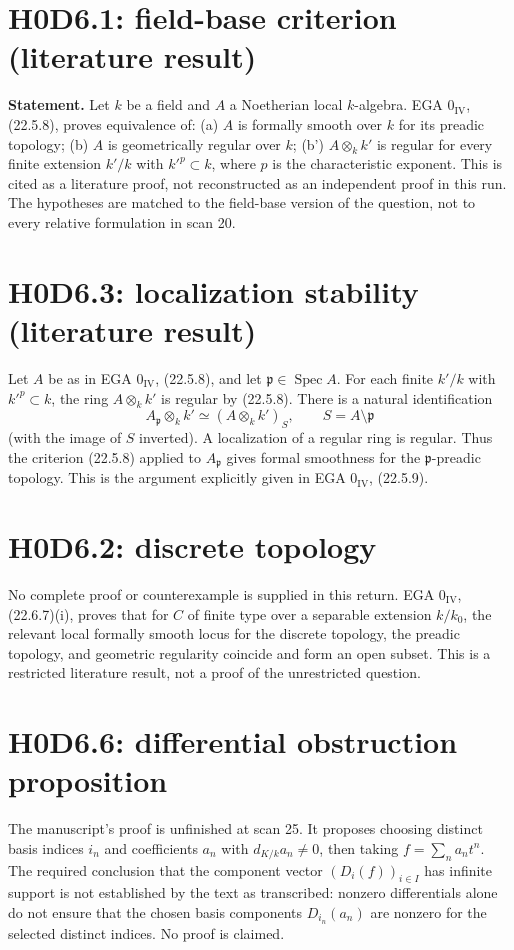 \section{H0D6.1: field-base criterion (literature result)}
\textbf{Statement.} Let $k$ be a field and $A$ a Noetherian local
$k$-algebra. EGA $0_{\mathrm{IV}}$, (22.5.8), proves equivalence of:
(a) $A$ is formally smooth over $k$ for its preadic topology;
(b) $A$ is geometrically regular over $k$;
(b') $A\otimes_k k'$ is regular for every finite extension $k'/k$
with $k'^p\subset k$, where $p$ is the characteristic exponent.
This is cited as a literature proof, not reconstructed as an independent
proof in this run. The hypotheses are matched to the field-base version
of the question, not to every relative formulation in scan 20.

\section{H0D6.3: localization stability (literature result)}
Let $A$ be as in EGA $0_{\mathrm{IV}}$, (22.5.8), and let
$\mathfrak p\in\operatorname{Spec}A$. For each finite $k'/k$ with
$k'^p\subset k$, the ring $A\otimes_k k'$ is regular by (22.5.8).
There is a natural identification
\[
 A_{\mathfrak p}\otimes_k k'\simeq
 (A\otimes_k k')_{S},\qquad
 S=A\setminus\mathfrak p
\]
(with the image of $S$ inverted). A localization of a regular ring is
regular. Thus the criterion (22.5.8) applied to $A_{\mathfrak p}$ gives
formal smoothness for the $\mathfrak p$-preadic topology. This is the
argument explicitly given in EGA $0_{\mathrm{IV}}$, (22.5.9).

\section{H0D6.2: discrete topology}
No complete proof or counterexample is supplied in this return.
EGA $0_{\mathrm{IV}}$, (22.6.7)(i), proves that for $C$ of finite type
over a separable extension $k/k_0$, the relevant local formally smooth
locus for the discrete topology, the preadic topology, and geometric
regularity coincide and form an open subset. This is a restricted
literature result, not a proof of the unrestricted question.

\section{H0D6.6: differential obstruction proposition}
The manuscript's proof is unfinished at scan 25. It proposes choosing
distinct basis indices $i_n$ and coefficients $a_n$ with
$d_{K/k}a_n\ne0$, then taking $f=\sum_n a_nt^n$. The required conclusion
that the component vector $(D_i(f))_{i\in I}$ has infinite support is
not established by the text as transcribed: nonzero differentials alone
do not ensure that the chosen basis components $D_{i_n}(a_n)$ are
nonzero for the selected distinct indices. No proof is claimed.
